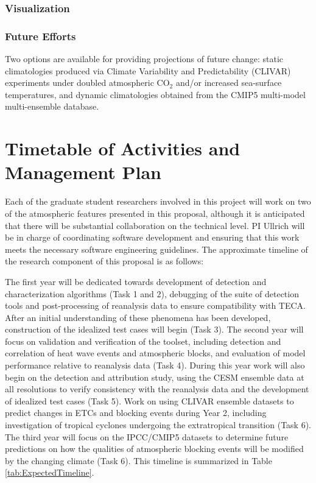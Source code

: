 \documentclass[11pt]{article}
\begin{document}
\subsubsection{Visualization}

\subsubsection{Future Efforts}

Two options are available for providing projections of future change: static climatologies produced via Climate Variability and Predictability (CLIVAR) experiments under doubled atmospheric CO$_2$ and/or increased sea-surface temperatures, and dynamic climatologies obtained from the CMIP5 multi-model multi-ensemble database.

\section{Timetable of Activities and Management Plan} \label{sec:Timeline}

Each of the graduate student researchers involved in this project will work on two of the atmospheric features presented in this proposal, although it is anticipated that there will be substantial collaboration on the technical level.  PI Ullrich will be in charge of coordinating software development and ensuring that this work meets the necessary software engineering guidelines.  The approximate timeline of the research component of this proposal is as follows:

The first year will be dedicated towards development of detection and characterization algorithms (Task 1 and 2), debugging of the suite of detection tools and post-processing of reanalysis data to ensure compatibility with TECA.  After an initial understanding of these phenomena has been developed, construction of the idealized test cases will begin (Task 3).  The second year will focus on validation and verification of the toolset, including detection and correlation of heat wave events and atmospheric blocks, and evaluation of model performance relative to reanalysis data (Task 4).  During this year work will also begin on the detection and attribution study, using the CESM ensemble data at all resolutions to verify consistency with the reanalysis data and the development of idealized test cases (Task 5).  Work on using CLIVAR ensemble datasets to predict changes in ETCs and blocking events during Year 2, including investigation of tropical cyclones undergoing the extratropical transition (Task 6).  The third year will focus on the IPCC/CMIP5 datasets to determine future predictions on how the qualities of atmospheric blocking events will be modified by the changing climate (Task  6).  This timeline is summarized in Table \ref{tab:ExpectedTimeline}.
\end{document}
